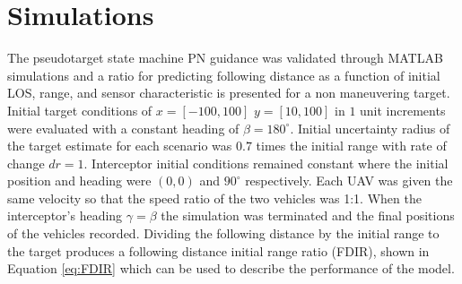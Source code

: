 \documentclass[conference]{IEEEtran}
\begin{document}
\section{Simulations}
The pseudotarget state machine PN guidance was validated through MATLAB simulations and a ratio for predicting following distance as a function of initial LOS, range, and sensor characteristic is presented for a non maneuvering target. Initial target conditions of $x = [-100,100]$ $y = [10,100]$ in $1$ unit increments were evaluated with a constant heading of $\beta = 180^{\circ}$. Initial uncertainty radius of the target estimate for each scenario was $0.7$ times the initial range with rate of change $dr = 1$. Interceptor initial conditions remained constant where the initial position and heading were $(0,0)$ and $90^{\circ}$ respectively. Each UAV was given the same velocity so that the speed ratio of the two vehicles was 1:1. When the interceptor's heading $\gamma = \beta$ the simulation was terminated and the final positions of the vehicles recorded. Dividing the following distance by the initial range to the target produces a following distance initial range ratio (FDIR), shown in Equation \ref{eq:FDIR} which can be used to describe the performance of the model.





\end{document}
